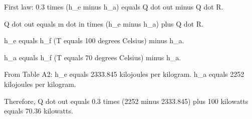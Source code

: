 First law: 0.3 times (h_e minus h_a) equals Q dot out minus Q dot R.  

Q dot out equals m dot in times (h_e minus h_a) plus Q dot R.  

h_e equals h_f (T equals 100 degrees Celsius) minus h_a.  

h_a equals h_f (T equals 70 degrees Celsius) minus h_a.  

From Table A2:  
h_e equals 2333.845 kilojoules per kilogram.  
h_a equals 2252 kilojoules per kilogram.  

Therefore, Q dot out equals 0.3 times (2252 minus 2333.845) plus 100 kilowatts equals 70.36 kilowatts.